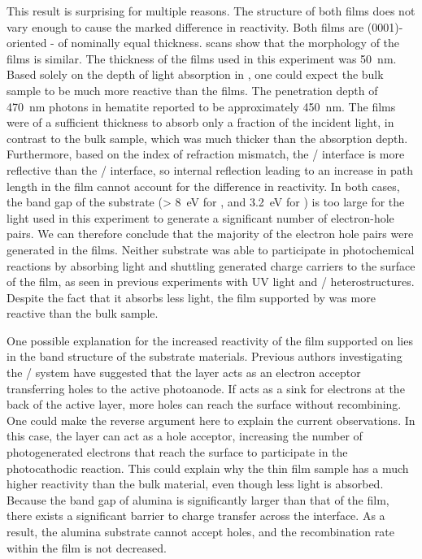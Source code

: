 This result is surprising for multiple reasons.  The structure of both films does not vary
enough to cause the marked difference in reactivity. Both films are (0001)-oriented
\textalpha- of nominally equal thickness.   scans show that the
morphology of the films is similar. The thickness of the films used in this experiment was
\texttildelow\SI{50}{\nano\meter}. Based solely on the depth of light absorption in
, one could expect the bulk sample to be much more reactive than the films.  The
penetration depth of \SI{470}{\nano\meter} photons in hematite reported to be
approximately \SI{450}{\nano\meter}.\cite{Marusak:1980gc}  The films were of a sufficient
thickness to absorb only a fraction of the incident light, in contrast to the bulk sample,
which was much thicker than the absorption depth. Furthermore, based on the index of
refraction mismatch, the / interface is more reflective than the
/ interface, so internal reflection leading to an increase in path
length in the film cannot account for the difference in reactivity.  In both cases, the
band gap of the substrate (> \SI{8}{\electronvolt} for ,\cite{French:1998wj} and
\SI{3.2}{\electronvolt}  for \cite{Cardona:1965vw}) is too large for the light
used in this experiment to generate a significant number of electron-hole pairs.  We can
therefore conclude that the majority of the electron hole pairs were generated in the
films. Neither substrate was able to participate in photochemical reactions by absorbing
light and shuttling generated charge carriers to the surface of the film, as seen in
previous experiments with UV light and /
heterostructures.\cite{Burbure:2010ti,Burbure:2010go}  Despite the fact that it absorbs
less light, the film supported by  was more reactive than the bulk sample.

One possible explanation for the increased reactivity of the film supported on 
lies in the band structure of the substrate materials. Previous authors investigating the
/ system have suggested that the  layer acts as an electron
acceptor transferring holes to the active  photoanode.\cite{Wang:2007fp} If
 acts as a sink for electrons at the back of the active layer, more holes can
reach the surface without recombining.  One could make the reverse argument here to
explain the current observations.  In this case, the  layer can act as a hole
acceptor, increasing the number of photogenerated electrons that reach the 
surface to participate in the photocathodic reaction.  This could explain why the thin
film sample has a much higher reactivity than the bulk material, even though less light is
absorbed.  Because the band gap of alumina is significantly larger than that of the
 film, there exists a significant barrier to charge transfer across the
interface.  As a result, the alumina substrate cannot accept holes, and the recombination
rate within the film is not decreased.

